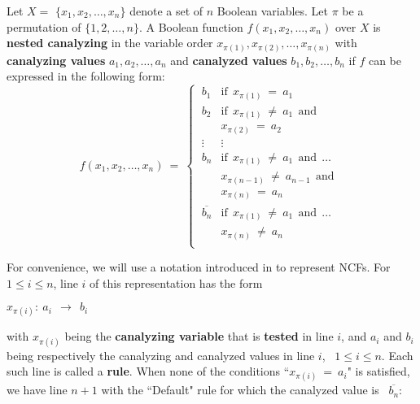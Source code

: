 \begin{definition}\label{def:nested_canalyzing}
Let $X = $ $\{x_1, x_2, \ldots, x_n\}$ denote a set of $n$  Boolean variables.
Let $\pi$ be a permutation of $\{1, 2, \ldots, n\}$.
A Boolean function $f(x_1, x_2, \ldots, x_n)$ over $X$ is \textbf{nested canalyzing}
in the variable order $x_{\pi(1)}, x_{\pi(2)}, \ldots, x_{\pi(n)}$ with
\textbf{canalyzing values} $a_1, a_2, \ldots, a_n$ and 
\textbf{canalyzed values} $b_1, b_2, \ldots, b_n$ 
if $f$ can be expressed in the following form:
\[
f(x_1, x_2, \ldots, x_n) ~=~ 
   \begin{cases}
       \:b_1 & \mathrm{if~~} x_{\pi(1)} ~=~ a_1 \\
       \:b_2 & \mathrm{if~~} x_{\pi(1)} ~\neq~ a_1 \mathrm{~~and~~}\\
             & x_{\pi(2)} ~=~ a_2 \\
       \:\vdots & \vdots \\ %
       \:b_n & \mathrm{if~~} x_{\pi(1)} ~\neq~ a_1 \mathrm{~~and~~} \ldots \\
             & x_{\pi(n-1)} ~\neq~ a_{n-1} \mathrm{~~and~~}\\
             & x_{\pi(n)} ~=~ a_n \\ %
       \:\overline{b_n} & \mathrm{if~~} x_{\pi(1)} ~\neq~ a_1 \mathrm{~~and~~} \ldots\\
                        & x_{\pi(n)} ~\neq~ a_n \\
   \end{cases}
\]
\end{definition}
For convenience, we will use a notation introduced in \cite{Stearns-etal-2018}
to represent NCFs.
For $1 \leq i \leq n$, line $i$ of this representation has the form

\medskip

\noindent
\hspace*{0.5in} $x_{\pi(i)}:~ a_i ~~\longrightarrow~~ b_i$

\medskip

\noindent 
with $x_{\pi(i)}$ being the \textbf{canalyzing variable} that is
\textbf{tested} in line $i$, 
and $a_i$ and $b_i$ being respectively the canalyzing and 
canalyzed values in line $i$,~ $1 \leq i \leq n$.
Each such line is called a \textbf{rule}.
When none of the conditions ``$x_{\pi(i)} ~=~ a_i$" 
is satisfied, we have line $n+1$ with the ``Default" rule
for which the canalyzed value is~ $\overline{b_n}$: 

\medskip

